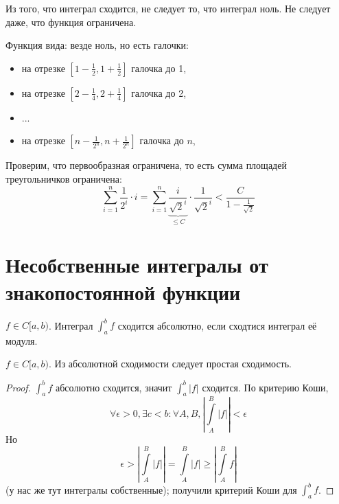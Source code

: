 \begin{Rem}
	Из того, что интеграл сходится, не следует то, что интеграл ноль.
	Не следует даже, что функция ограничена.
\end{Rem}
\begin{exmp}
	Функция вида: везде ноль, но есть галочки:
	\begin{itemize}
		\item на отрезке $\left[1 - \frac12, 1 + \frac12\right]$ галочка до 1,
		\item на отрезке $\left[2 - \frac14, 2 + \frac14\right]$ галочка до 2,
		\item ...
		\item на отрезке $\left[n - \frac1{2^n}, n + \frac1{2^n}\right]$ галочка до $n$,
	\end{itemize}
	Проверим, что первообразная ограничена, то есть сумма площадей треугольничков ограничена:
	\[
		\sum_{i=1}^n \frac1{2^i} \cdot i
		= \sum_{i=1}^n \underbrace{\frac i{\sqrt{2}^i}}_{\le C} \cdot \frac1{\sqrt{2}^i}
		< \frac{C}{1-\frac1{\sqrt 2}}
	\]
\end{exmp}

\section{Несобственные интегралы от знакопостоянной функции}

\begin{Def}
	$f \in C[a, b)$.
	Интеграл $\int_a^b f$ сходится абсолютно, если сходтися интеграл её модуля.
\end{Def}

\begin{theorem}
	$f \in C[a, b)$.
	Из абсолютной сходимости следует простая сходимость.
\end{theorem}
\begin{proof}
	$\int_a^b f$ абсолютно сходится, значит $\int_a^b |f|$ сходится.
	По критерию Коши,
	\[ \forall \epsilon > 0, \exists c < b\colon \forall A, B, \left|\int\limits_A^B |f|\right| < \epsilon \]
	Но
	\[ \epsilon > \left|\int\limits_A^B |f|\right| = \int\limits_A^B |f| \ge \left| \int\limits_A^B f \right|\]
	(у нас же тут интегралы собственные);
	получили критерий Коши для $\int_a^b f$.
\end{proof}
